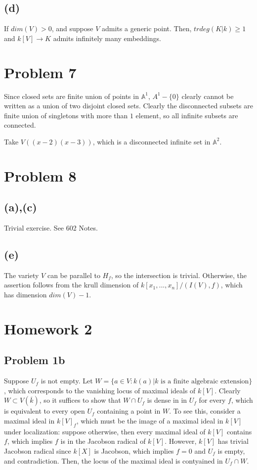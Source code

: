 \documentclass{article}
\theoremstyle{definition}
\theoremstyle{definition}
\theoremstyle{definition}
\theoremstyle{definition}
\theoremstyle{definition}
\theoremstyle{definition}
\theoremstyle{definition}
\begin{document}
\subsection*{(d)}
If $dim(V)>0$, and suppose $V$ admits a generic point. Then, $trdeg(K|k)\geq 1$ and $k[V]\to K$ admits infinitely many embeddings.  

\section*{Problem 7}
Since closed sets are finite union of points in $\mathbb{A}^1$, ${A}^1-\{0\}$ clearly cannot be written as a union of two disjoint closed sets. Clearly the disconnected subsets are finite union of singletons with more than $1$ element, so all infinite subsets are connected. 

Take $V((x-2)(x-3))$, which is a disconnected infinite set in $\mathbb{A}^2$.

\section*{Problem 8}
\subsection*{(a),(c)}
Trivial exercise. See 602 Notes.

\subsection*{(e)}
The variety $V$ can be parallel to $H_f$, so the intersection is trivial. Otherwise, the assertion follows from the krull dimension of $k[x_1,...,x_n]/(I(V),f)$, which has dimension $dim(V)-1$. 



\section*{Homework 2}
\subsection*{Problem 1b}
Suppose $U_f$ is not empty. Let $W=\{ a\in V: k(a)|k \textrm{ is a finite algebraic extension} \}$, which corresponds to the vanishing locus of maximal ideals of $k[V]$. Clearly $W\subset V(\overline{k})$, so it suffices to show that $W\cap U_f$ is dense in in $U_f$ for every $f$, which is equivalent to every open $U_f$ containing a point in $W$. To see this, consider a maximal ideal in $k[V]_f$, which must be the image of a maximal ideal in $k[V]$ under localization: suppose otherwise, then every maximal ideal of $k[V]$ contains $f$, which implies $f$ is in the Jacobson radical of $k[V]$. However, $k[V]$ has trivial Jacobson radical since $k[X]$ is Jacobson, which implies $f=0$ and $U_f$ is empty, and contradiction. Then, the locus of the maximal ideal is contyained in $U_f\cap W$.
\end{document}
